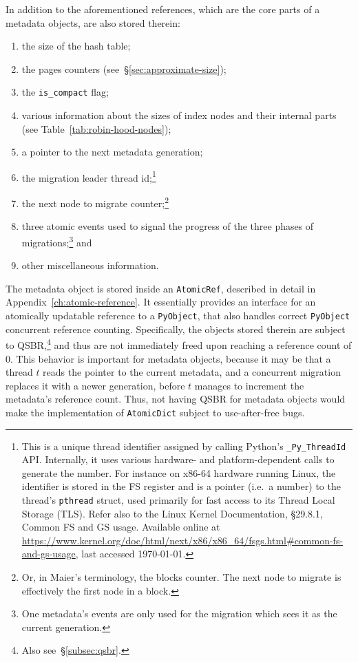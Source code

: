 In addition to the aforementioned references, which are the core parts of a metadata objects, are also stored therein:
\begin{enumerate}
	\item the size of the hash table;
	\item the pages counters (see~\S\ref{sec:approximate-size});
	\item the \texttt{is\_compact} flag;
	\item various information about the sizes of index nodes and their internal parts (see Table~\ref{tab:robin-hood-nodes});
	\item a pointer to the next metadata generation;
	\item the migration leader thread id;\footnote{%
		This is a unique thread identifier assigned by calling Python's \texttt{\_Py\_ThreadId} API.
		Internally, it uses various hardware- and platform-dependent calls to generate the number.
		For instance on x86-64 hardware running Linux, the identifier is stored in the FS register and is a pointer (i.e.\ a number) to the thread's \texttt{pthread} struct, used primarily for fast access to its Thread Local Storage (TLS).
		Refer also to the Linux Kernel Documentation, \S29.8.1, Common FS and GS usage.
		Available online at \url{https://www.kernel.org/doc/html/next/x86/x86_64/fsgs.html#common-fs-and-gs-usage}, last accessed \today.
	}
	\item the next node to migrate counter;\footnote{%
		Or, in Maier's terminology, the blocks counter.
		The next node to migrate is effectively the first node in a block.
	}
	\item three atomic events used to signal the progress of the three phases of migrations;\footnote{%
		One metadata's events are only used for the migration which sees it as the current generation.
	} and
	\item other miscellaneous information.
\end{enumerate}

The metadata object is stored inside an \texttt{AtomicRef}, described in detail in Appendix~\ref{ch:atomic-reference}.
It essentially provides an interface for an atomically updatable reference to a \texttt{PyObject}, that also handles correct \texttt{PyObject} concurrent reference counting.
Specifically, the objects stored therein are subject to QSBR,\footnote{Also see~\S\ref{subsec:qsbr}.} and thus are not immediately freed upon reaching a reference count of 0.
This behavior is important for metadata objects, because it may be that a thread $t$ reads the pointer to the current metadata, and a concurrent migration replaces it with a newer generation, before $t$ manages to increment the metadata's reference count.
Thus, not having QSBR for metadata objects would make the implementation of \texttt{AtomicDict} subject to use-after-free bugs.

